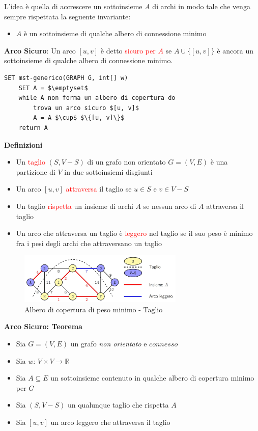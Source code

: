\documentclass[../cheatSheetAlgoritmi.tex]{subfiles}
\begin{document}
L'idea è quella di accrescere un sottoinsieme $A$ di archi in modo tale che venga sempre rispettata la seguente invariante:
\begin{itemize}
	\item $A$ è un sottoinsieme di qualche albero di connessione minimo
\end{itemize}
\textbf{Arco Sicuro}: Un arco $[u, v]$ è detto \textcolor{red}{sicuro per $A$} se $A \cup \{[u,v]\}$ è ancora un sottoinsieme di qualche albero di connessione minimo.
\begin{lstlisting}[caption=Algoritmo Generico MST]
SET mst-generico(GRAPH G, int[] w)
	SET A = $\emptyset$
	while A non forma un albero di copertura do
		trova un arco sicuro $[u, v]$
		A = A $\cup$ $\{[u, v]\}$
	return A
\end{lstlisting}
\newpage
\begin{flushleft}
\textbf{Definizioni}
\end{flushleft}
\begin{itemize}
	\item Un \textcolor{red}{taglio} $(S, V - S)$ di un grafo non orientato $G = (V, E)$ è una partizione di $V$ in due sottoinsiemi disgiunti
	\item Un arco $[u, v]$ \textcolor{red}{attraversa} il taglio se $u \in S$ e $v \in V - S$
	\item Un taglio \textcolor{red}{rispetta} un insieme di archi $A$ se nessun arco di $A$ attraversa il taglio
	\item Un arco che attraversa un taglio è \textcolor{red}{leggero} nel taglio se il suo peso è minimo fra i pesi degli archi che attraversano un taglio
\end{itemize}
\begin{figure}[h]
	\centering
	\includegraphics[width=0.7\textwidth]{../img/Greedy_4.jpg}
	\caption{Albero di copertura di peso minimo - Taglio}
\end{figure}
\textbf{Arco Sicuro: Teorema}
\begin{itemize}
	\item Sia $G = (V, E)$ un grafo \emph{non orientato} e $connesso$
	\item Sia $w$: $V \times V \rightarrow \mathbb{R}$
	\item Sia $A \subseteq E$ un sottoinsieme contenuto in qualche albero di copertura minimo per $G$
	\item Sia $(S, V - S)$ un qualunque taglio che rispetta $A$
	\item Sia $[u, v]$ un arco leggero che attraversa il taglio
\end{itemize}
\end{document}

